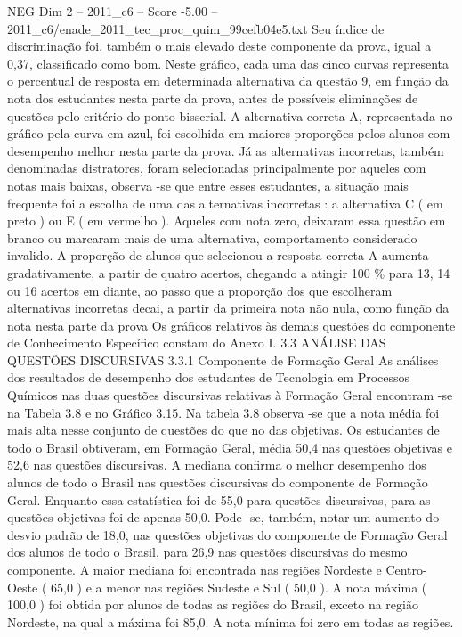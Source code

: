 \begin{textsample}{NEG Dim 2 – 2011\_c6 – Score -5.00 – 2011\_c6/enade\_2011\_tec\_proc\_quim\_99cefb04e5.txt}
Seu índice de discriminação foi, também o mais elevado deste componente da prova, igual a 0,37, classificado como bom.
Neste gráfico, cada uma das cinco curvas representa o percentual de resposta em determinada alternativa da questão 9, em função da nota dos estudantes nesta parte da prova, antes de possíveis eliminações de questões pelo critério do ponto bisserial.
A alternativa correta A, representada no gráfico pela curva em azul, foi escolhida em maiores proporções pelos alunos com desempenho melhor nesta parte da prova.
Já as alternativas incorretas, também denominadas distratores, foram selecionadas principalmente por aqueles com notas mais baixas, observa -se que entre esses estudantes, a situação mais frequente foi a escolha de uma das alternativas incorretas : a alternativa C ( em preto ) ou E ( em vermelho ).
Aqueles com nota zero, deixaram essa questão em branco ou marcaram mais de uma alternativa, comportamento considerado invalido.
A proporção de alunos que selecionou a resposta correta A aumenta gradativamente, a partir de quatro acertos, chegando a atingir 100 \% para 13, 14 ou 16 acertos em diante, ao passo que a proporção dos que escolheram alternativas incorretas decai, a partir da primeira nota não nula, como função da nota nesta parte da prova Os gráficos relativos às demais questões do componente de Conhecimento Específico constam do Anexo I. 3.3 ANÁLISE DAS QUESTÕES DISCURSIVAS 3.3.1 Componente de Formação Geral As análises dos resultados de desempenho dos estudantes de Tecnologia em Processos Químicos nas duas questões discursivas relativas à Formação Geral encontram -se na Tabela 3.8 e no Gráfico 3.15.
Na tabela 3.8 observa -se que a nota média foi mais alta nesse conjunto de questões do que no das objetivas.
Os estudantes de todo o Brasil obtiveram, em Formação Geral, média 50,4 nas questões objetivas e 52,6 nas questões discursivas.
A mediana confirma o melhor desempenho dos alunos de todo o Brasil nas questões discursivas do componente de Formação Geral.
Enquanto essa estatística foi de 55,0 para questões discursivas, para as questões objetivas foi de apenas 50,0.
Pode -se, também, notar um aumento do desvio padrão de 18,0, nas questões objetivas do componente de Formação Geral dos alunos de todo o Brasil, para 26,9 nas questões discursivas do mesmo componente.
A maior mediana foi encontrada nas regiões Nordeste e Centro-Oeste ( 65,0 ) e a menor nas regiões Sudeste e Sul ( 50,0 ).
A nota máxima ( 100,0 ) foi obtida por alunos de todas as regiões do Brasil, exceto na região Nordeste, na qual a máxima foi 85,0.
A nota mínima foi zero em todas as regiões.

\end{textsample}
